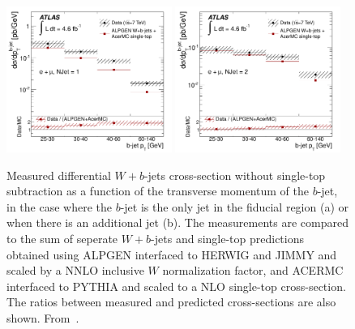 \documentclass[11pt]{cernrep}
\begin{document}
\begin{figure}
\begin{center}
\includegraphics[width=0.48\textwidth]{fig_09a.pdf}
\includegraphics[width=0.48\textwidth]{fig_09b.pdf}
\caption{\label{fig:wb}
Measured differential $W+b$-jets cross-section without single-top subtraction as a function of the transverse momentum of the $b$-jet, in the 
case where the $b$-jet is the only jet in the fiducial region (a) or when there is an additional jet (b). 
The measurements are compared to the sum of seperate $W+b$-jets and single-top predictions 
obtained using ALPGEN interfaced to HERWIG and JIMMY and scaled by a NNLO inclusive $W$ normalization factor, and ACERMC interfaced to PYTHIA and scaled to a 
NLO single-top cross-section. 
The ratios between measured and predicted cross-sections are also shown. From~\protect\cite{Aad:2013vka}.}
\end{center}
\end{figure}
\end{document}
